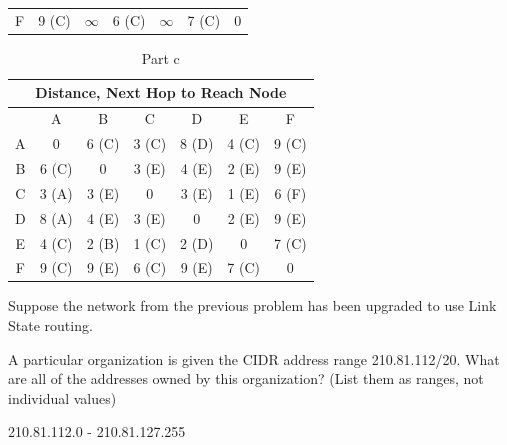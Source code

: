 \documentclass[12pt,addpoints,answers]{exam}
\begin{document}
\begin{questions}
\begin{table}[]
\begin{tabular}{|c|c|c|c|c|c|c|}
		F & 9 (C)    & $\infty$ & 6 (C) & $\infty$ & 7 (C) & 0       
	\end{tabular}
\end{table}
\begin{table}[]
	\centering
	\caption{Part c}
	\label{Solution 7}
	\begin{tabular}{|c|c|c|c|c|c|c|}
		\hline
		\multicolumn{7}{|c|}{Distance, Next Hop to Reach Node} \\ \hline
		& A      & B      & C      & D      & E     & F     \\ \hline
		A  & 0      & 6 (C)  & 3 (C)  & 8 (D)  & 4 (C) & 9 (C) \\
		B  & 6 (C)  & 0      & 3 (E)  & 4 (E)  & 2 (E) & 9 (E) \\
		C  & 3 (A)  & 3 (E)  & 0      & 3 (E)  & 1 (E) & 6 (F) \\
		D  & 8 (A)  & 4 (E)  & 3 (E)  & 0      & 2 (E) & 9 (E) \\
		E  & 4 (C)  & 2 (B)  & 1 (C)  & 2 (D)  & 0     & 7 (C) \\
		F  & 9 (C)  & 9 (E)  & 6 (C)  & 9 (E)  & 7 (C) & 0    
	\end{tabular}
\end{table}

\newpage

\question Suppose the network from the previous problem has been upgraded to use Link State routing.

\question[6] A particular organization is given the CIDR address range 210.81.112/20. What are all of the addresses owned by this organization? (List them as ranges, not individual values)
\begin{solution}
	 210.81.112.0 - 210.81.127.255 
\end{solution}


\end{questions}
\end{document}
